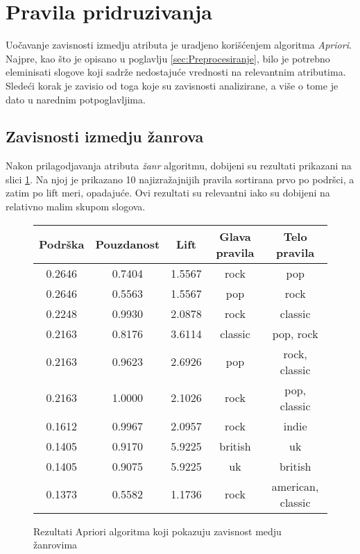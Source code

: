 \section{Pravila pridruzivanja}
\label{sec:PravilaPridruzivanja}

Uo\v{c}avanje zavisnosti izmedju atributa je uradjeno kori\v{s}\'c{}enjem algoritma \emph{Apriori}. Najpre, kao \v{s}to je opisano u poglavlju \ref{sec:Preprocesiranje}, bilo je potrebno eleminisati slogove koji sadr\v{z}e nedostaju\'c{}e vrednosti na relevantnim atributima. Slede\'c{}i korak je zavisio od toga koje su zavisnosti analizirane, a vi\v{s}e o tome je dato u narednim potpoglavljima.


\subsection{Zavisnosti izmedju \v{z}anrova}
\label{subsec:AprioriZavisnostZanrova}

Nakon prilagodjavanja atributa \emph{\v{z}anr} algoritmu, dobijeni su rezultati prikazani na slici \ref{fig:aprioriZanrovi}. Na njoj je prikazano 10 najizra\v{z}ajnijih pravila sortirana prvo po podr\v{s}ci, a zatim po lift meri, opadaju\'c{}e.
Ovi rezultati su relevantni iako su dobijeni na relativno malim skupom slogova. 

\begin{figure}[H]
    \footnotesize
    \centering
    \begin{tabular}{|c|c|c|c|c|}
        \hline
        Podr\v{s}ka & Pouzdanost & Lift & Glava pravila  & Telo pravila \\
        \hline
        0.2646 & 0.7404 & 1.5567 & rock & pop \\
        0.2646 & 0.5563 & 1.5567 & pop & rock \\
        0.2248 & 0.9930 & 2.0878 & rock & classic \\
        0.2163 & 0.8176 & 3.6114 & classic & pop, rock \\
        0.2163 & 0.9623 & 2.6926 & pop & rock, classic \\
        0.2163 & 1.0000 & 2.1026 & rock & pop, classic \\
        0.1612 & 0.9967 & 2.0957 & rock & indie \\
        0.1405 & 0.9170 & 5.9225 & british & uk \\
        0.1405 & 0.9075 & 5.9225 & uk & british \\
        0.1373 & 0.5582 & 1.1736 & rock & american, classic \\
        \hline
    \end{tabular}
    \caption{Rezultati Apriori algoritma koji pokazuju zavisnost medju \v{z}anrovima}
    \label{fig:aprioriZanrovi}
\end{figure}


